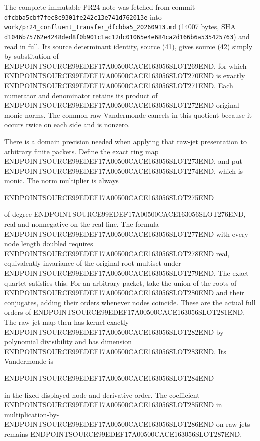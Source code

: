 The complete immutable PR24 note was fetched from commit \texttt{dfcbba5cbf7fec8c9301fe242c13e741d762013e} into \texttt{work/pr24\_confluent\_transfer\_dfcbba5\_20260913.md} (14007 bytes, SHA \texttt{d1046b75762e4248ded8f0b901c1ac12dc01065e4e684ca2d166b6a535425763}) and read in full. Its source determinant identity, source (41), gives source (42) simply by substitution of ENDPOINTSOURCE99EDEF17A00500CACE163056SLOT269END, for which ENDPOINTSOURCE99EDEF17A00500CACE163056SLOT270END is exactly ENDPOINTSOURCE99EDEF17A00500CACE163056SLOT271END. Each numerator and denominator retains its product of ENDPOINTSOURCE99EDEF17A00500CACE163056SLOT272END original monic norms. The common raw Vandermonde cancels in this quotient because it occurs twice on each side and is nonzero.

There is a domain precision needed when applying that raw-jet presentation to arbitrary finite packets. Define the exact ring map ENDPOINTSOURCE99EDEF17A00500CACE163056SLOT273END, and put ENDPOINTSOURCE99EDEF17A00500CACE163056SLOT274END, which is monic. The norm multiplier is always

ENDPOINTSOURCE99EDEF17A00500CACE163056SLOT275END

of degree ENDPOINTSOURCE99EDEF17A00500CACE163056SLOT276END, real and nonnegative on the real line. The formula ENDPOINTSOURCE99EDEF17A00500CACE163056SLOT277END with every node length doubled requires ENDPOINTSOURCE99EDEF17A00500CACE163056SLOT278END real, equivalently invariance of the original root multiset under ENDPOINTSOURCE99EDEF17A00500CACE163056SLOT279END. The exact quartet satisfies this. For an arbitrary packet, take the union of the roots of ENDPOINTSOURCE99EDEF17A00500CACE163056SLOT280END and their conjugates, adding their orders whenever nodes coincide. These are the actual full orders of ENDPOINTSOURCE99EDEF17A00500CACE163056SLOT281END. The raw jet map then has kernel exactly ENDPOINTSOURCE99EDEF17A00500CACE163056SLOT282END by polynomial divisibility and has dimension ENDPOINTSOURCE99EDEF17A00500CACE163056SLOT283END. Its Vandermonde is

ENDPOINTSOURCE99EDEF17A00500CACE163056SLOT284END

in the fixed displayed node and derivative order. The coefficient ENDPOINTSOURCE99EDEF17A00500CACE163056SLOT285END in multiplication-by-ENDPOINTSOURCE99EDEF17A00500CACE163056SLOT286END on raw jets remains ENDPOINTSOURCE99EDEF17A00500CACE163056SLOT287END.

